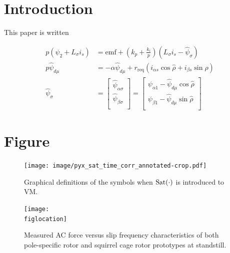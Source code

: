 \documentclass[journal]{IEEEtran}
\begin{document}
\section{Introduction}

This paper is written

\begin{subequations}\label{eq:CLEST:main}
\begin{align}
    p\left( \psi _2+L_{\sigma}i_s \right) &=\mathrm{emf}+\left( k_p+\frac{k_i}{p} \right) \left( L_{\sigma}i_s-\hat{\psi}_{\sigma} \right) \label{eq:clest:a}\\
    p\hat{\psi}_{d\mu}&=-\alpha \hat{\psi}_{d\mu}+r_{\mathrm{req}}\left( i_{\alpha s}\cos \hat{\rho}+i_{\beta s}\sin \hat{\rho} \right) \label{eq:clest:b}\\
    \hat{\psi}_{\sigma}&=\left[ \begin{array}{c}
    \hat{\psi}_{\alpha \sigma}\\
    \hat{\psi}_{\beta \sigma}\\
\end{array} \right] =\left[ \begin{array}{c}
    \psi _{\alpha 1}-\hat{\psi}_{d\mu}\cos \hat{\rho}\\
    \psi _{\beta 1}-\hat{\psi}_{d\mu}\sin \hat{\rho}\\
\end{array} \right] \label{eq:clest:c}
\end{align}
\end{subequations}

\section{Figure}

\begin{figure}[t]
  \centering
  \texttt{[image: image/pyx\_sat\_time\_corr\_annotated-crop.pdf]}
  \caption{Graphical definitions of the symbols when $\rm Sat(\cdot)$ is introduced to VM.}
  \label{fig:GraphicalDefSatVM}
\end{figure}


\renewcommand{\figlocation}{images/AC-Force-Test-SC+PS-crop.pdf}
\renewcommand{\figname}{Measured AC force versus slip frequency characteristics of both pole-specific rotor and squirrel cage rotor prototypes at standstill.}
\renewcommand{\figlabel}{fig:ACForceVersusSlip}
\begin{figure}[t]
    \centering
    \texttt{[image: \\figlocation]}
    \vspace{-2ex}
    \caption{\figname}
    \label{\figlabel}
    \vspace{-2ex}
\end{figure}
\end{document}
